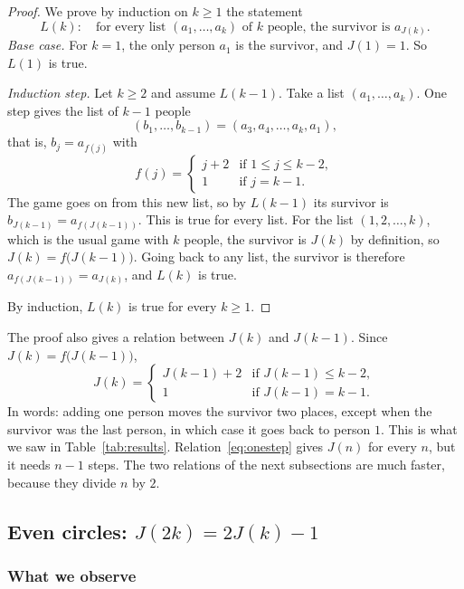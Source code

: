\begin{proof}
We prove by induction on $k\geq1$ the statement
\[
L(k):\quad\text{for every list $(a_1,\dots,a_k)$ of $k$ people, the survivor
is $a_{J(k)}$.}
\]
\emph{Base case.} For $k=1$, the only person $a_1$ is the survivor, and
$J(1)=1$. So $L(1)$ is true.

\emph{Induction step.} Let $k\geq2$ and assume $L(k-1)$. Take a list
$(a_1,\dots,a_k)$. One step gives the list of $k-1$ people
\[
(b_1,\dots,b_{k-1})=(a_3,a_4,\dots,a_k,a_1),
\]
that is, $b_j=a_{f(j)}$ with
\[
f(j)=\begin{cases} j+2 & \text{if } 1\leq j\leq k-2,\\ 1 & \text{if } j=k-1.
\end{cases}
\]
The game goes on from this new list, so by $L(k-1)$ its survivor is
$b_{J(k-1)}=a_{f(J(k-1))}$. This is true for every list. For the list
$(1,2,\dots,k)$, which is the usual game with $k$ people, the survivor is
$J(k)$ by definition, so $J(k)=f\big(J(k-1)\big)$. Going back to any list, the
survivor is therefore $a_{f(J(k-1))}=a_{J(k)}$, and $L(k)$ is true.

By induction, $L(k)$ is true for every $k\geq1$.
\end{proof}

The proof also gives a relation between $J(k)$ and $J(k-1)$. Since
$J(k)=f\big(J(k-1)\big)$,
\begin{equation}\label{eq:onestep}
J(k)=\begin{cases} J(k-1)+2 & \text{if } J(k-1)\leq k-2,\\
1 & \text{if } J(k-1)=k-1 .\end{cases}
\end{equation}
In words: adding one person moves the survivor two places, except when the
survivor was the last person, in which case it goes back to person $1$. This
is what we saw in Table~\ref{tab:results}. Relation~\eqref{eq:onestep} gives
$J(n)$ for every $n$, but it needs $n-1$ steps. The two relations of the next
subsections are much faster, because they divide $n$ by $2$.

\subsection{Even circles: \texorpdfstring{$J(2k)=2J(k)-1$}{J(2k) = 2J(k) - 1}}\label{sec:even}

\subsubsection{What we observe}

